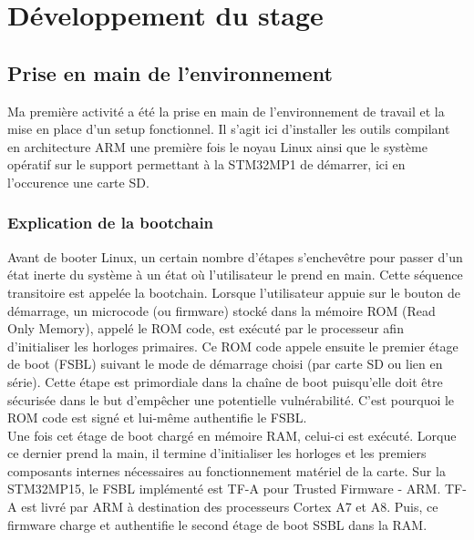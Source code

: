 
\section{Développement du stage}
\label{chp:part2:activities}

\subsection{Prise en main de l’environnement}
\label{sec:taking_environment}

Ma première activité a été la prise en main de l'environnement de travail et
la mise en place d'un setup fonctionnel. Il s'agit ici d'installer les outils
compilant en architecture ARM une première fois le noyau Linux ainsi que le
système opératif sur le support permettant à la STM32MP1 de démarrer, ici en
l'occurence une carte SD.

\subsubsection{Explication de la bootchain}
\label{sec:bootchain_overview}

Avant de booter Linux, un certain nombre d'étapes s'enchevêtre pour passer
d'un état inerte du système à un état où l'utilisateur le prend en main. Cette
séquence transitoire est appelée la bootchain. Lorsque l'utilisateur appuie
sur le bouton de démarrage, un microcode (ou firmware) stocké dans la mémoire
ROM (Read Only Memory), appelé le ROM code, est exécuté par le processeur afin
d'initialiser les horloges primaires. Ce ROM code appele ensuite le premier
étage de boot (FSBL) suivant le mode de démarrage choisi (par carte SD ou lien
en série). Cette étape est primordiale dans la chaîne de boot puisqu'elle doit
être sécurisée dans le but d'empêcher une potentielle vulnérabilité. C'est
pourquoi le ROM code est signé et lui-même authentifie le FSBL. \\

Une fois cet étage de boot chargé en mémoire RAM, celui-ci est exécuté. Lorque
ce dernier prend la main, il termine d'initialiser les horloges et les
premiers composants internes nécessaires au fonctionnement matériel de la
carte. Sur la STM32MP15, le FSBL implémenté est TF-A pour Trusted Firmware -
ARM. TF-A est livré par ARM à destination des processeurs Cortex A7 et A8.
Puis, ce firmware charge et authentifie le second étage de boot SSBL dans la
RAM. \\

